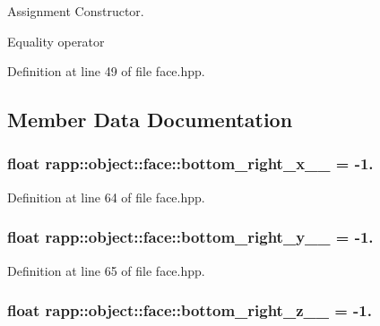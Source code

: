 Assignment Constructor. 

Equality operator 

Definition at line 49 of file face.\-hpp.



\subsection{Member Data Documentation}
\hypertarget{classrapp_1_1object_1_1face_afc08b0adb766ef20c60bcd8c21d07852}{
\subsubsection[{bottom\-\_\-right\-\_\-x\-\_\-\-\_\-}]{\setlength{\rightskip}{0pt plus 5cm}float rapp\-::object\-::face\-::bottom\-\_\-right\-\_\-x\-\_\-\-\_\- = -\/1.\hspace{0.3cm}{\ttfamily [private]}}}\label{classrapp_1_1object_1_1face_afc08b0adb766ef20c60bcd8c21d07852}


Definition at line 64 of file face.\-hpp.

\hypertarget{classrapp_1_1object_1_1face_a228058127dbd3077c97edbed509865b8}{
\subsubsection[{bottom\-\_\-right\-\_\-y\-\_\-\-\_\-}]{\setlength{\rightskip}{0pt plus 5cm}float rapp\-::object\-::face\-::bottom\-\_\-right\-\_\-y\-\_\-\-\_\- = -\/1.\hspace{0.3cm}{\ttfamily [private]}}}\label{classrapp_1_1object_1_1face_a228058127dbd3077c97edbed509865b8}


Definition at line 65 of file face.\-hpp.

\hypertarget{classrapp_1_1object_1_1face_aa2e04032673a342f092f3a47a2419505}{
\subsubsection[{bottom\-\_\-right\-\_\-z\-\_\-\-\_\-}]{\setlength{\rightskip}{0pt plus 5cm}float rapp\-::object\-::face\-::bottom\-\_\-right\-\_\-z\-\_\-\-\_\- = -\/1.\hspace{0.3cm}{\ttfamily [private]}}}\label{classrapp_1_1object_1_1face_aa2e04032673a342f092f3a47a2419505}


